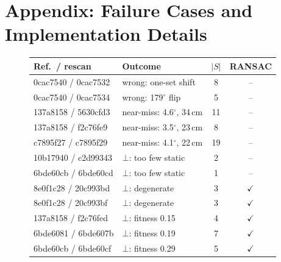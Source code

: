 \documentclass[11pt, a4paper]{article}
\begin{document}
\section{Appendix: Failure Cases and Implementation Details}
\begin{figure}[h]
\centering
\begin{minipage}{0.45\linewidth}\centering\scriptsize
\captionsetup{justification=raggedright,singlelinecheck=false}
\label{tab:failures}
\setlength{\tabcolsep}{2.5pt}
\begin{tabular}{@{}llcc@{}}
\toprule
Ref.\ / rescan & Outcome & $|S|$ & RANSAC \\
\midrule
0cac7540 / 0cac7532 & wrong: one-set shift & 8 & -- \\
0cac7540 / 0cac7534 & wrong: 179$^\circ$ flip & 5 & -- \\
137a8158 / 5630cfd3 & near-miss: 4.6$^\circ$, 34\,cm & 11 & -- \\
137a8158 / f2c76fe9 & near-miss: 3.5$^\circ$, 23\,cm & 8 & -- \\
c7895f27 / c7895f29 & near-miss: 4.1$^\circ$, 22\,cm & 19 & -- \\
10b17940 / c2d99343 & $\bot$: too few static & 2 & -- \\
6bde60cb / 6bde60cd & $\bot$: too few static & 1 & -- \\
8e0f1c28 / 20c993bd & $\bot$: degenerate & 3 & $\checkmark$ \\
8e0f1c28 / 20c993bf & $\bot$: degenerate & 3 & $\checkmark$ \\
137a8158 / f2c76fed & $\bot$: fitness 0.15 & 4 & $\checkmark$ \\
6bde6081 / 6bde607b & $\bot$: fitness 0.19 & 7 & $\checkmark$ \\
6bde60cb / 6bde60cf & $\bot$: fitness 0.29 & 5 & $\checkmark$ \\
\bottomrule
\end{tabular}
\end{minipage}\hfill
\begin{minipage}{0.51\linewidth}\small\raggedright
\captionsetup{justification=raggedright,singlelinecheck=false}
\label{tab:params}
\footnotesize\setlength{\tabcolsep}{3pt}

\end{minipage}
\end{figure}
\end{document}
